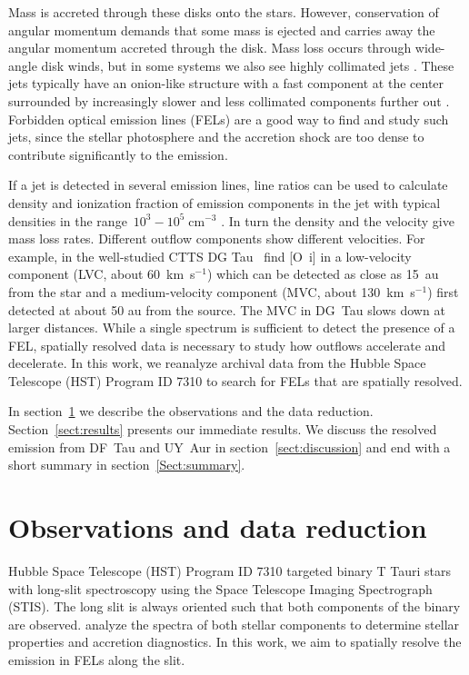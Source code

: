 \documentclass[twocolumn,trackchanges]{aastex63}
\begin{document}
Mass is accreted through these disks onto the stars. However,
conservation of angular momentum demands that some mass is ejected and
carries away the angular momentum accreted through
the disk. Mass
loss occurs through wide-angle disk winds, but in some systems we 
also see highly collimated jets . These jets typically have an onion-like
structure with a fast component at the center surrounded by increasingly
slower and less collimated components further
out \citep{2000ApJ...537L..49B}. Forbidden optical emission lines (FELs) are a
good way to find and study such jets, since the stellar photosphere and
the accretion shock are too dense to contribute significantly to the emission. 



If a
jet is detected in several emission lines, line ratios can be used to
calculate density and ionization fraction of emission components in the
jet with typical densities in the range~$10^3-10^5\;\mathrm{cm}^{-3}$
\citep[e.g.][]{1999A&A...342..717B,2000A&A...356L..41L,2013A&A...550L...1S}. In turn
the density and the velocity give mass loss rates. Different outflow
components show different velocities. For example, in the well-studied
CTTS DG Tau~\citet{2013A&A...550L...1S} find [O~{\sc i}] in a low-velocity
component (LVC, about 60~km~s$^{-1}$) which can be detected as
close as 15~au from the star and a medium-velocity component (MVC, about
130~km~s$^{-1}$) first detected at about 50 au from the source. The MVC in DG~Tau
slows down at larger distances. While a single spectrum is sufficient to
detect the presence of a FEL, spatially resolved data is necessary to study
how outflows accelerate and decelerate. In this work, we reanalyze
archival data from the Hubble Space Telescope (HST) Program ID 7310 to
search for FELs that are spatially resolved.

In section~\ref{sect:obs} we describe the observations and the data reduction. Section~\ref{sect:results} presents our immediate results. We discuss the resolved emission from DF~Tau and UY~Aur in section~\ref{sect:discussion} and end with a short summary in section~\ref{Sect:summary}.

\section{Observations and data reduction}
\label{sect:obs}



Hubble Space Telescope (HST) Program ID 7310 targeted binary T Tauri
stars with long-slit spectroscopy using the Space Telescope Imaging
Spectrograph (STIS). The long slit is always oriented such that both
components of the binary are observed. \citet{2003ApJ...583..334H} analyze the
spectra of both stellar components to determine stellar properties and
accretion diagnostics. In this work, we aim to spatially resolve the
emission in FELs along the slit.
\end{document}
